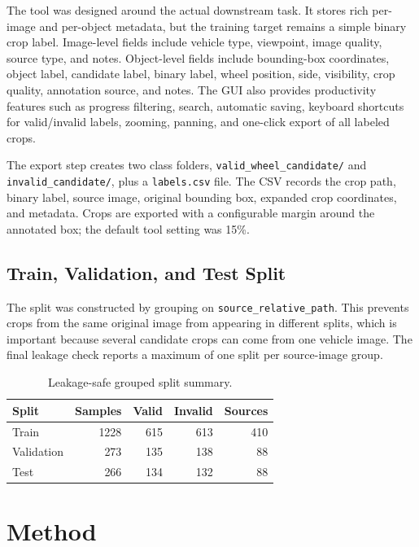 \documentclass[letterpaper, 10 pt]{IEEEconf}
\begin{document}
The tool was designed around the actual downstream task. It stores rich per-
image and per-object metadata, but the training target remains a simple binary
crop label. Image-level fields include vehicle type, viewpoint, image quality,
source type, and notes. Object-level fields include bounding-box coordinates,
object label, candidate label, binary label, wheel position, side, visibility,
crop quality, annotation source, and notes. The GUI also provides productivity
features such as progress filtering, search, automatic saving, keyboard
shortcuts for valid/invalid labels, zooming, panning, and one-click export of
all labeled crops.

The export step creates two class folders,
\texttt{valid\_wheel\_candidate/} and \texttt{invalid\_candidate/}, plus a
\texttt{labels.csv} file. The CSV records the crop path, binary label, source
image, original bounding box, expanded crop coordinates, and metadata. Crops are
exported with a configurable margin around the annotated box; the default tool
setting was 15\%.

\subsection{Train, Validation, and Test Split}

The split was constructed by grouping on \texttt{source\_relative\_path}. This
prevents crops from the same original image from appearing in different splits,
which is important because several candidate crops can come from one vehicle
image. The final leakage check reports a maximum of one split per source-image
group.

\begin{table}[t]
\caption{Leakage-safe grouped split summary.}
\label{tab:split}
\centering
\begin{tabular}{lrrrr}
\toprule
Split & Samples & Valid & Invalid & Sources \\
\midrule
Train & 1228 & 615 & 613 & 410 \\
Validation & 273 & 135 & 138 & 88 \\
Test & 266 & 134 & 132 & 88 \\
\bottomrule
\end{tabular}
\end{table}

\section{Method}
\end{document}
